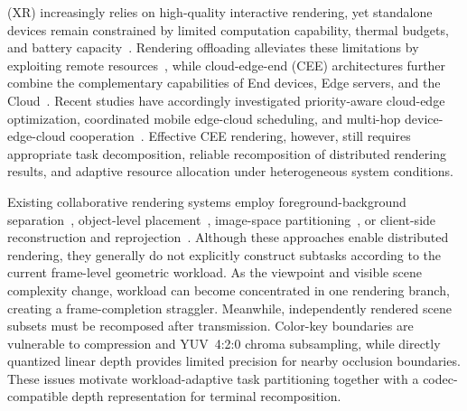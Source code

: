 \documentclass[10pt,journal,compsoc]{IEEEtran}
\begin{document}
\maketitle
\IEEEdisplaynontitleabstractindextext
\IEEEpeerreviewmaketitle


 (XR) increasingly relies on high-quality interactive rendering, yet standalone devices remain constrained by limited computation capability, thermal budgets, and battery capacity~\cite{lai_furion_2020,chen_you_2025}. Rendering offloading alleviates these limitations by exploiting remote resources~\cite{zhao_virtual_2021,huang_virtual_2023}, while cloud-edge-end (CEE) architectures further combine the complementary capabilities of End devices, Edge servers, and the Cloud~\cite{su_crossport_2026,li_toward_2024}. Recent studies have accordingly investigated priority-aware cloud-edge optimization, coordinated mobile edge-cloud scheduling, and multi-hop device-edge-cloud cooperation~\cite{10185617,tian_task_2025,liu_trustworthy_2025}. Effective CEE rendering, however, still requires appropriate task decomposition, reliable recomposition of distributed rendering results, and adaptive resource allocation under heterogeneous system conditions.

Existing collaborative rendering systems employ foreground-background separation~\cite{lai_furion_2020,meng_coterie_2020}, object-level placement~\cite{lu_renderfusion_2023}, image-space partitioning~\cite{corbillon_viewport-adaptive_2017,cantory_image-space_2023}, or client-side reconstruction and reprojection~\cite{ke_collabvr_2023,gao_xrgo_2025}. Although these approaches enable distributed rendering, they generally do not explicitly construct subtasks according to the current frame-level geometric workload. As the viewpoint and visible scene complexity change, workload can become concentrated in one rendering branch, creating a frame-completion straggler. Meanwhile, independently rendered scene subsets must be recomposed after transmission. Color-key boundaries are vulnerable to compression and YUV~4:2:0 chroma subsampling, while directly quantized linear depth provides limited precision for nearby occlusion boundaries. These issues motivate workload-adaptive task partitioning together with a codec-compatible depth representation for terminal recomposition.
\end{document}
